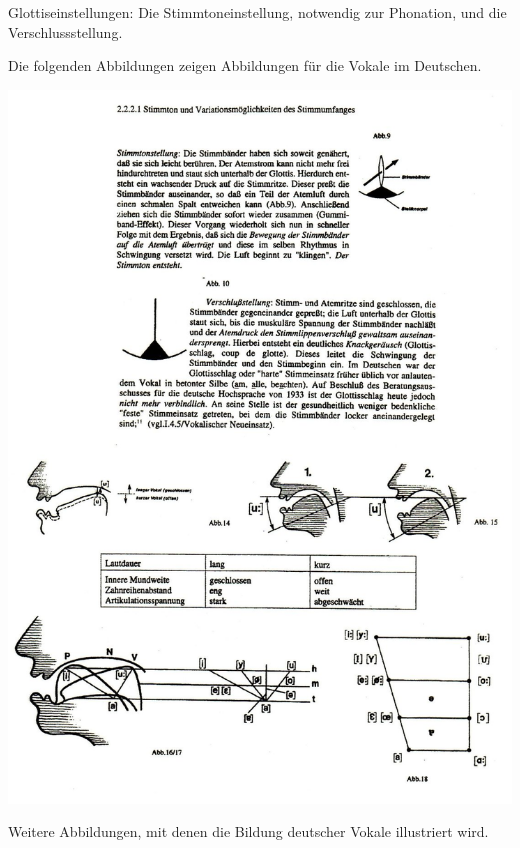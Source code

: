 \documentclass[
  letterpaper,
]{scrbook}
\begin{document}
Glottiseinstellungen: Die Stimmtoneinstellung, notwendig zur Phonation,
und die Verschlussstellung.

Die folgenden Abbildungen zeigen Abbildungen für die Vokale im
Deutschen.

\includegraphics[width=1\textwidth,height=\textheight]{./pictures/02a_Gehrmann-Sprechwerkzeuge_Vokale_page-0002.jpg}

Weitere Abbildungen, mit denen die Bildung deutscher Vokale illustriert
wird.
\end{document}
